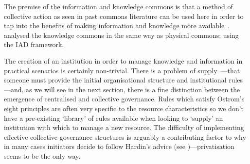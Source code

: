
The premise of the information and knowledge commons is that a method of collective action as seen in past commons literature can be used here in order to tap into the benefits of making information and knowledge more available~\citep{Hess2007,MayoFusterMorell2010,Shadbolt2013}. \citet{Ostrom2007a} analysed the knowledge commons in the same way as physical commons: using the \ac{IAD} framework.

The creation of an institution in order to manage knowledge and information in practical scenarios is certainly non-trivial. 
There is a problem of supply~\cite[p. 42]{Ostrom1990}---that someone must provide the initial organisational structure and institutional rules---and, as we will see in the next section, there is a fine distinction between the emergence of centralised and collective governance. 
Rules which satisfy Ostrom's eight principles are often very specific to the resource characteristics so we don't have a pre-existing `library' of rules available when looking to `supply' an institution with which to manage a new resource. 
The difficulty of implementing effective collective governance structures is arguably a contributing factor to why in many cases initiators decide to follow Hardin's advice (see )---privatisation seems to be the only way.



